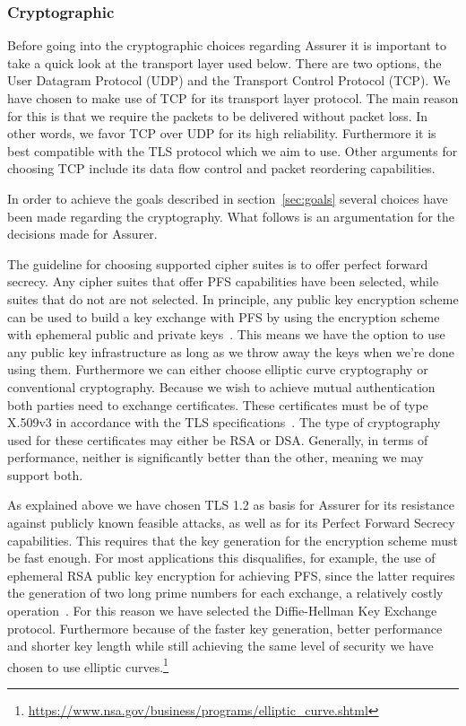\subsubsection{Cryptographic}
Before going into the cryptographic choices regarding Assurer it is important to take a quick look at the transport layer used below. There are two options, the User Datagram Protocol (UDP) and the Transport Control Protocol (TCP). We have chosen to make use of TCP for its transport layer protocol. The main reason for this is that we require the packets to be delivered without packet loss. In other words, we favor TCP over UDP for its high reliability. Furthermore it is best compatible with the TLS protocol which we aim to use. Other arguments for choosing TCP include its data flow control and packet reordering capabilities.

In order to achieve the goals described in section~\ref{sec:goals} several choices have been made regarding the cryptography. What follows is an argumentation for the decisions made for Assurer. 

The guideline for choosing supported cipher suites is to offer perfect forward secrecy. Any cipher suites that offer PFS capabilities have been selected, while suites that do not are not selected. In principle, any public key encryption scheme can be used to build a key exchange with PFS by using the encryption scheme with ephemeral public and private keys~\cite{PFS}. This means we have the option to use any public key infrastructure as long as we throw away the keys when we're done using them. Furthermore we can either choose elliptic curve cryptography or conventional cryptography. Because we wish to achieve mutual authentication both parties need to exchange certificates. These certificates must be of type X.509v3 in accordance with the TLS specifications~\cite{tls1.2}. The type of cryptography used for these certificates may either be RSA or DSA. Generally, in terms of performance, neither is significantly better than the other, meaning we may support both. 

As explained above we have chosen TLS 1.2 as basis for Assurer for its resistance against publicly known feasible attacks, as well as for its Perfect Forward Secrecy capabilities. This requires that the key generation for the encryption scheme must be fast enough. For most applications this disqualifies, for example, the use of ephemeral RSA public key encryption for achieving PFS, since the latter requires the generation of two long prime numbers for each exchange, a relatively costly operation~\cite{PFS}. For this reason we have selected the Diffie-Hellman Key Exchange protocol. Furthermore because of the faster key generation, better performance and shorter key length while still achieving the same level of security we have chosen to use elliptic curves.\footnote{\url{https://www.nsa.gov/business/programs/elliptic_curve.shtml}}

